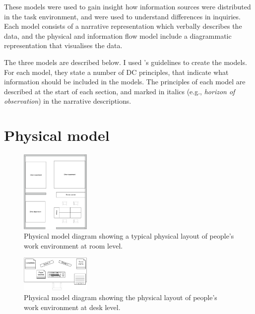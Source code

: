 These models were used to gain insight how information sources were distributed in the task environment, and were used to understand differences in inquiries. Each model consists of a narrative representation which verbally describes the data, and the physical and information flow model include a diagrammatic representation that visualises the data. 

The three models are described below. I used \citet{Furniss2006}'s guidelines to create the models. For each model, they state a number of DC principles, that indicate what information should be included in the models.
The principles of each model are described at the start of each section, and marked in italics (e.g., \textit{horizon of observation}) in the narrative descriptions.

\section{Physical model}
\begin{figure}[!ht]
\centering
\includegraphics[width=0.3\textwidth]{images/ch12/ch12_physmodroom.pdf}
\caption[Study 2 Physical room model]{Physical model diagram showing a typical physical layout of people's work environment at room level.}
\vspace{-9pt}
\label{fig:ch12_physmodroom}
\end{figure}

\begin{figure}[!ht]
\centering
\includegraphics[width=0.3\textwidth]{images/ch12/ch12_physmoddesk.pdf}
\caption[Study 2 Physical desk model]{Physical model diagram showing the physical layout of people's work environment at desk level.}
\vspace{-9pt}
\label{fig:ch12_physmodroom}
\end{figure}

